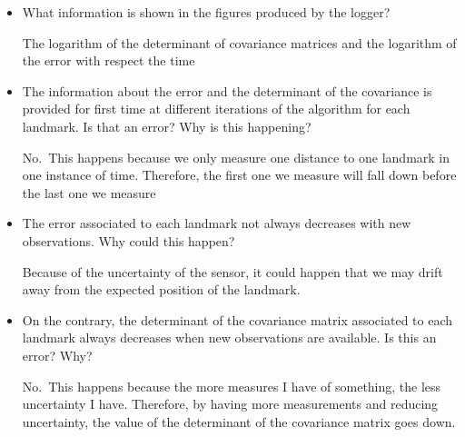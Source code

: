 \documentclass[11pt]{article}
\begin{document}
\begin{itemize}
\item
  What information is shown in the figures produced by the logger?

  The logarithm of the determinant of covariance matrices and the
  logarithm of the error with respect the time
\item
  The information about the error and the determinant of the covariance
  is provided for first time at different iterations of the algorithm
  for each landmark. Is that an error? Why is this happening?

  No.~This happens because we only measure one distance to one landmark
  in one instance of time. Therefore, the first one we measure will fall
  down before the last one we measure
\item
  The error associated to each landmark not always decreases with new
  observations. Why could this happen?

  Because of the uncertainty of the sensor, it could happen that we may
  drift away from the expected position of the landmark.
\item
  On the contrary, the determinant of the covariance matrix associated
  to each landmark always decreases when new observations are available.
  Is this an error? Why?

  No.~This happens because the more measures I have of something, the
  less uncertainty I have. Therefore, by having more measurements and
  reducing uncertainty, the value of the determinant of the covariance
  matrix goes down.
\end{itemize}


    
    
    
\end{document}
